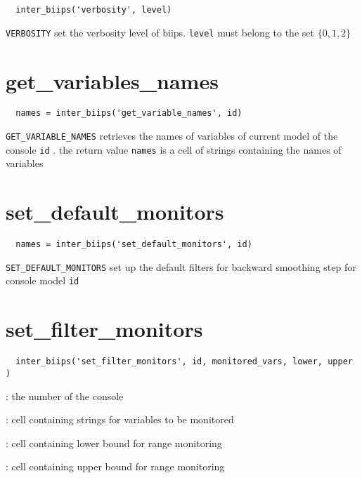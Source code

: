 \documentclass[11pt]{article}
\begin{document}
 \begin{lstlisting}
  inter_biips('verbosity', level) 
 \end{lstlisting}

  \texttt{VERBOSITY} set the verbosity level of biips. \texttt{level} must belong to the set $\{0,1,2\}$

\section{get\_variables\_names}

 \begin{lstlisting}
  names = inter_biips('get_variable_names', id)
 \end{lstlisting}

 \texttt{GET\_VARIABLE\_NAMES} retrieves the names of variables of current model of the console \texttt{id} . the return value \texttt{names}
 is a cell of strings containing the names of variables

\section{set\_default\_monitors}

 \begin{lstlisting}
  names = inter_biips('set_default_monitors', id)
 \end{lstlisting}

 \texttt{SET\_DEFAULT\_MONITORS} set up the default filters for backward smoothing step for console model \texttt{id}

\section{set\_filter\_monitors}
 \begin{lstlisting}
  inter_biips('set_filter_monitors', id, monitored_vars, lower, upper )
 \end{lstlisting}
   
   \begin{description}
   \setlength{\baselineskip}{0.1\baselineskip}
     \item[\texttt{id}] : the number of the console
     \item[\texttt{monitored\_vars}] : cell containing strings for variables to be monitored
     \item[\texttt{lower}] : cell containing lower bound for range monitoring
     \item[\texttt{upper}] : cell containing upper bound for range monitoring 
   
   \end{description}
\end{document}
